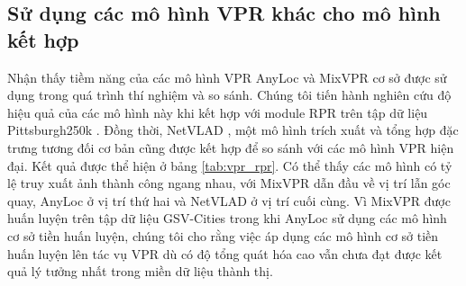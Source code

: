 \subsection{Sử dụng các mô hình VPR khác cho mô hình kết hợp}

Nhận thấy tiềm năng của các mô hình VPR AnyLoc \cite{keetha2023anyloc} và MixVPR cơ sở \cite{alibey2023mixvpr} được sử dụng trong quá trình thí nghiệm và so sánh. Chúng tôi tiến hành nghiên cứu độ hiệu quả của các mô hình này khi kết hợp với module RPR trên tập dữ liệu Pittsburgh250k \cite{6618963}. Đồng thời, NetVLAD \cite{arandjelovic2016netvlad}, một mô hình trích xuất và tổng hợp đặc trưng tương đối cơ bản cũng được kết hợp để so sánh với các mô hình VPR hiện đại. Kết quả được thể hiện ở bảng \ref{tab:vpr_rpr}. Có thể thấy các mô hình có tỷ lệ truy xuất ảnh thành công ngang nhau, với MixVPR dẫn đầu về vị trí lẫn góc quay, AnyLoc ở vị trí thứ hai và NetVLAD ở vị trí cuối cùng. Vì MixVPR được huấn luyện trên tập dữ liệu GSV-Cities \cite{Ali_bey_2022} trong khi AnyLoc sử dụng các mô hình cơ sở tiền huấn luyện, chúng tôi cho rằng việc áp dụng các mô hình cơ sở tiền huấn luyện lên tác vụ VPR dù có độ tổng quát hóa cao vẫn chưa đạt được kết quả lý tưởng nhất trong miền dữ liệu thành thị.

